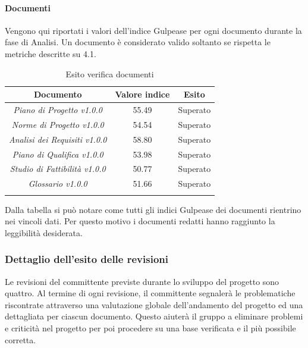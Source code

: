 \paragraph{Documenti} \Spazio
Vengono qui riportati i valori dell’indice Gulpease per ogni documento durante la fase
di Analisi. Un documento è considerato valido soltanto se rispetta le metriche descritte
su 4.1.
\begin{longtable}{|c|c|c|}
\hline
\textbf{Documento} & \textbf{Valore indice} & \textbf{Esito} \\
\hline
	\emph{Piano di Progetto v1.0.0} & {55.49} & {Superato}\\
\hline
	\emph{Norme di Progetto v1.0.0} & {54.54} & {Superato}\\
\hline
	\emph{Analisi dei Requisiti v1.0.0} & {58.80} & {Superato}\\
\hline
	\emph{Piano di Qualifica v1.0.0} & {53.98} & {Superato}\\
\hline
	\emph{Studio di Fattibilità v1.0.0} & {50.77} & {Superato}\\
\hline
	\emph{Glossario v1.0.0} & {51.66} & {Superato}\\
\hline
\caption[Esiti verifica documenti, Analisi]{Esito verifica documenti}
\label{tabella:verifica documenti}
\endhead
\end{longtable}
Dalla tabella si può notare come tutti gli indici Gulpease dei documenti rientrino nei vincoli dati. Per questo motivo i documenti redatti hanno raggiunto la leggibilità desiderata.
\subsubsection{Dettaglio dell’esito delle revisioni}
Le revisioni del committente previste durante lo sviluppo del progetto sono quattro.
Al termine di ogni revisione, il committente segnalerà le problematiche riscontrate attraverso una valutazione globale dell'andamento del progetto ed una dettagliata per ciascun documento. 
Questo aiuterà il gruppo a eliminare problemi e criticità nel progetto per poi procedere su una base verificata e il più possibile corretta.
\pagebreak